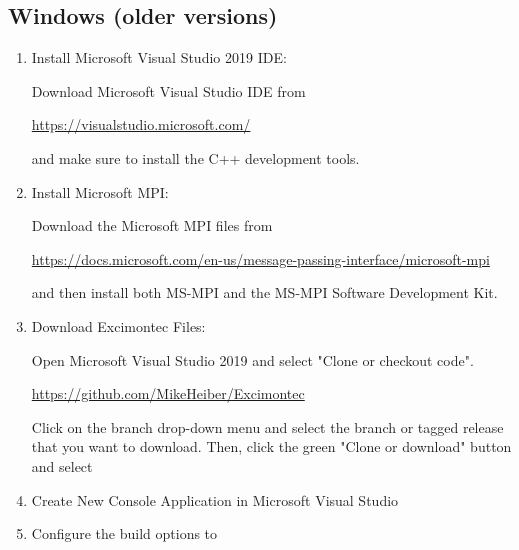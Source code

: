\documentclass[%
 reprint,onecolumn,notitlepage,
superscriptaddress,longbibliography,
 amsmath,amssymb,
 aps,rmp,floatfix,
]{revtex4-1}
\begin{document}
\subsection{Windows (older versions)}

\begin{enumerate}

\item Install Microsoft Visual Studio 2019 IDE:
    
Download Microsoft Visual Studio IDE from

\url{https://visualstudio.microsoft.com/}

and make sure to install the C++ development tools.

\item Install Microsoft MPI:

Download the Microsoft MPI files from
    
\url{https://docs.microsoft.com/en-us/message-passing-interface/microsoft-mpi}
    
and then install both MS-MPI and the MS-MPI Software Development Kit.

\item Download Excimontec Files:

Open Microsoft Visual Studio 2019 and select "Clone or checkout code".

\url{https://github.com/MikeHeiber/Excimontec}

Click on the branch drop-down menu and select the branch or tagged release that you want to download. 
Then, click the green "Clone or download" button and select 

\item Create New Console Application in Microsoft Visual Studio

\item Configure the build options to

\end{enumerate}


\end{document}
